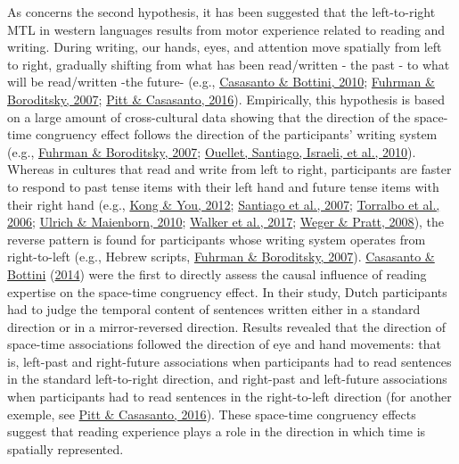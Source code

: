 \documentclass[
  a4paper,12pt,twoside,onecolumn,openright,final,oldfontcommands]{memoir}
\begin{document}
As concerns the second hypothesis, it has been suggested that the left-to-right MTL in western languages results from motor experience related to reading and writing. During writing, our hands, eyes, and attention move spatially from left to right, gradually shifting from what has been read/written - the past - to what will be read/written -the future- (e.g., \protect\hyperlink{ref-hutchison_can_2010}{Casasanto \& Bottini, 2010}; \protect\hyperlink{ref-fuhrman_mental_2007}{Fuhrman \& Boroditsky, 2007}; \protect\hyperlink{ref-pitt_reading_2016}{Pitt \& Casasanto, 2016}). Empirically, this hypothesis is based on a large amount of cross-cultural data showing that the direction of the space-time congruency effect follows the direction of the participants' writing system (e.g., \protect\hyperlink{ref-fuhrman_mental_2007}{Fuhrman \& Boroditsky, 2007}; \protect\hyperlink{ref-ouellet_is_2010}{Ouellet, Santiago, Israeli, et al., 2010}). Whereas in cultures that read and write from left to right, participants are faster to respond to past tense items with their left hand and future tense items with their right hand (e.g., \protect\hyperlink{ref-kong_space-time_2012}{Kong \& You, 2012}; \protect\hyperlink{ref-santiago_time_2007}{Santiago et al., 2007}; \protect\hyperlink{ref-torralbo_flexible_2006}{Torralbo et al., 2006}; \protect\hyperlink{ref-ulrich_leftright_2010}{Ulrich \& Maienborn, 2010}; \protect\hyperlink{ref-walker_spatial_2017}{Walker et al., 2017}; \protect\hyperlink{ref-weger_time_2008}{Weger \& Pratt, 2008}), the reverse pattern is found for participants whose writing system operates from right-to-left (e.g., Hebrew scripts, \protect\hyperlink{ref-fuhrman_mental_2007}{Fuhrman \& Boroditsky, 2007}). \protect\hyperlink{ref-casasanto_spatial_2014}{Casasanto \& Bottini} (\protect\hyperlink{ref-casasanto_spatial_2014}{2014}) were the first to directly assess the causal influence of reading expertise on the space-time congruency effect. In their study, Dutch participants had to judge the temporal content of sentences written either in a standard direction or in a mirror-reversed direction. Results revealed that the direction of space-time associations followed the direction of eye and hand movements: that is, left-past and right-future associations when participants had to read sentences in the standard left-to-right direction, and right-past and left-future associations when participants had to read sentences in the right-to-left direction (for another exemple, see \protect\hyperlink{ref-pitt_reading_2016}{Pitt \& Casasanto, 2016}). These space-time congruency effects suggest that reading experience plays a role in the direction in which time is spatially represented.
\end{document}
